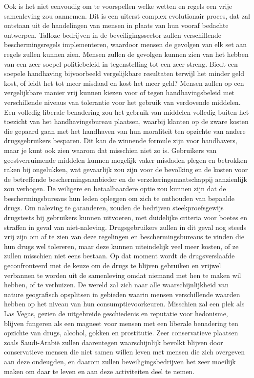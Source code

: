 Ook is het niet eenvoudig om te voorspellen welke wetten en regels een vrije samenleving zou aannemen. Dit is een uiterst complex evolutionair proces, dat zal ontstaan uit de handelingen van mensen in plaats van hun vooraf bedachte ontwerpen. Talloze bedrijven in de beveiligingssector zullen verschillende beschermingsregels implementeren, waardoor mensen de gevolgen van elk set aan regels zullen kunnen zien. Mensen zullen de gevolgen kunnen zien van het hebben van een zeer soepel politiebeleid in tegenstelling tot een zeer streng. Biedt een soepele handhaving bijvoorbeeld vergelijkbare resultaten terwijl het minder geld kost, of leidt het tot meer misdaad en kost het meer geld? Mensen zullen op een vergelijkbare manier vrij kunnen kiezen voor of tegen handhavingsbeleid met verschillende niveaus van tolerantie voor het gebruik van verdovende middelen. Een volledig liberale benadering zou het gebruik van middelen volledig buiten het toezicht van het handhavingsbureau plaatsen, waarbij klanten op de zware kosten die gepaard gaan met het handhaven van hun moraliteit ten opzichte van andere drugsgebruikers besparen. Dit kan de winnende formule zijn voor handhavers, maar je kunt ook zien waarom dat misschien niet zo is. Gebruikers van geestverruimende middelen kunnen mogelijk vaker misdaden plegen en betrokken raken bij ongelukken, wat gevaarlijk zou zijn voor de bevolking en de kosten voor de betreffende beschermingsaanbieder en de verzekeringsmaatschappij aanzienlijk zou verhogen. De veiligere en betaalbaardere optie zou kunnen zijn dat de beschermingsbureaus hun leden opleggen om zich te onthouden van bepaalde drugs. Om naleving te garanderen, zouden de bedrijven steekproefsgewijs drugstests bij gebruikers kunnen uitvoeren, met duidelijke criteria voor boetes en straffen in geval van niet-naleving. Drugsgebruikers zullen in dit geval nog steeds vrij zijn om af te zien van deze regelingen en beschermingsbureaus te vinden die hun drugs wel tolereren, maar deze kunnen uiteindelijk veel meer kosten, of ze zullen misschien niet eens bestaan. Op dat moment wordt de drugsverslaafde geconfronteerd met de keuze om de drugs te blijven gebruiken en vrijwel verbannen te worden uit de samenleving omdat niemand met hen te maken wil hebben, of te verhuizen. De wereld zal zich naar alle waarschijnlijkheid van nature geografisch opsplitsen in gebieden waarin mensen verschillende waarden hebben op het niveau van hun consumptievoorkeuren. Misschien zal een plek als Las Vegas, gezien de uitgebreide geschiedenis en reputatie voor hedonisme, blijven fungeren als een magneet voor mensen met een liberale benadering ten opzichte van drugs, alcohol, gokken en prostitutie. Zeer conservatieve plaatsen zoals Saudi-Arabië zullen daarentegen waarschijnlijk bevolkt blijven door conservatieve mensen die niet samen willen leven met mensen die zich overgeven aan deze ondeugden, en daarom zullen beveiligingsbedrijven het zeer moeilijk maken om daar te leven en aan deze activiteiten deel te nemen.

